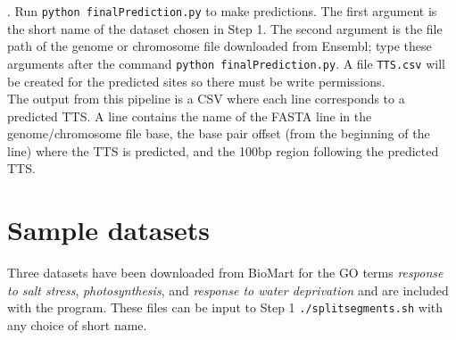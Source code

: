 \documentclass[12pt,letterpaper]{report}
\begin{document}
. \indent Run \texttt{python finalPrediction.py} to make predictions. The first argument is the short name of the dataset chosen in Step 1. The second argument is the file path of the genome or chromosome file downloaded from Ensembl; type these arguments after the command \texttt{python finalPrediction.py}. A file \texttt{TTS.csv} will be created for the predicted sites so there must be write permissions.\\
\indent The output from this pipeline is a CSV where each line corresponds to a predicted TTS. A line contains the name of the FASTA line in the genome/chromosome file base, the base pair offset (from the beginning of the line) where the TTS is predicted, and the 100bp region following the predicted TTS. 

\section*{Sample datasets}
Three datasets have been downloaded from BioMart for the GO terms \textit{response to salt stress}, \textit{photosynthesis}, and \textit{response to water deprivation} and are included with the program. These files can be input to Step 1 \texttt{./splitsegments.sh} with any choice of short name.



\end{document}
